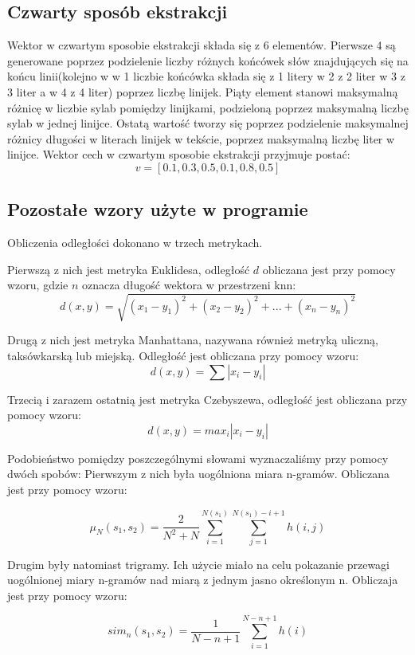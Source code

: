 \documentclass{classrep}
\begin{document}
	
	\subsection{Czwarty sposób ekstrakcji}
	Wektor w czwartym sposobie ekstrakcji składa się z 6 elementów. Pierwsze 4 są generowane poprzez podzielenie liczby różnych końcówek słów znajdujących się na końcu linii(kolejno w w 1 liczbie końcówka składa się z 1 litery w 2 z 2 liter w 3 z 3 liter a w 4 z 4 liter) poprzez liczbę linijek. Piąty element stanowi maksymalną różnicę w liczbie sylab pomiędzy linijkami, podzieloną poprzez maksymalną liczbę sylab w jednej linijce. Ostatą wartość tworzy się poprzez podzielenie maksymalnej różnicy długości w literach linijek w tekście, poprzez maksymalną liczbę liter w linijce.
	Wektor cech w czwartym sposobie ekstrakcji przyjmuje postać:
	\[ v=[0.1, 0.3, 0.5, 0.1, 0.8, 0.5]\]
	
	\subsection{Pozostałe wzory użyte w programie}
	
	Obliczenia odległości dokonano w trzech metrykach.
	
	Pierwszą z nich jest metryka Euklidesa, odległość \( d \) obliczana jest przy pomocy wzoru, gdzie \(n\) oznacza długość wektora w przestrzeni knn: 
\[ d\left ( x,y \right )=\sqrt{\left ( x_{1}-y_{1} \right )^{2} + \left ( x_{2}-y_{2} \right )^{2} + ... + \left ( x_{n}-y_{n} \right )^{2}} \]

	Drugą z nich jest metryka Manhattana, nazywana również metryką uliczną, taksówkarską lub miejską. Odległość jest obliczana przy pomocy wzoru:
\[ d\left ( x,y \right )=\sum|x_{i}-y_{i}| \]

	Trzecią i zarazem ostatnią jest metryka Czebyszewa, odległość jest obliczana przy pomocy wzoru:
$$ d(x,y) = max_{i}   |x_{i}-y_{i}| $$

	Podobieństwo pomiędzy poszczególnymi słowami wyznaczaliśmy przy pomocy dwóch spobów:
Pierwszym z nich była uogólniona miara n-gramów. Obliczana jest przy pomocy wzoru:

$$ \mu_{N}(s_{1}, s_{2})= \frac{2}{N^{2} + N}  \sum_{i=1}^{N(s_{1})} \sum_{j=1}^{N(s_{1})-i+1}  h(i,j) $$

Drugim były natomiast trigramy. Ich użycie miało na celu pokazanie przewagi uogólnionej miary n-gramów nad miarą z jednym jasno określonym n. Obliczaja jest przy pomocy wzoru:

$$ sim_{n}(s_{1}, s_{2}) = \frac{1}{N - n + 1} \sum_{i = 1}^{N-n+1} h(i) $$
\end{document}
